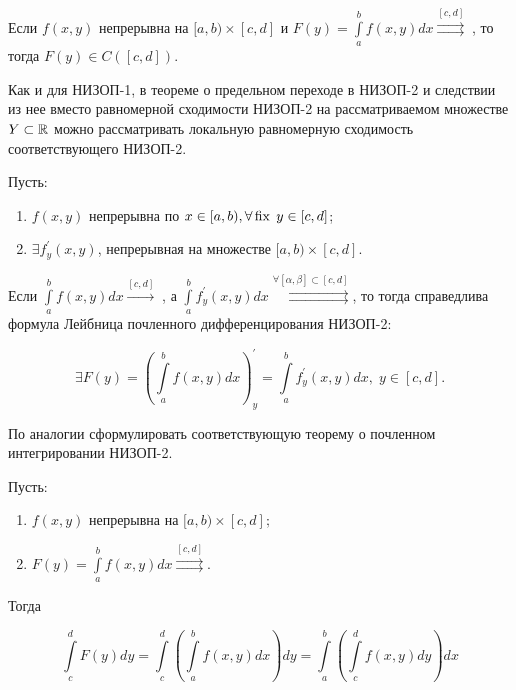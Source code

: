 \documentclass[../../main.tex]{subfiles}
\begin{document}
	\begin{crl*}
		Если $f(x, y)$ непрерывна на $[a, b) \times [c, d]$ и $F(y) = 
		\int\limits_a^b f(x, y) dx \overset{[c, d]}\rightrightarrows \;$, то тогда 
		$F(y) \in C([c, d])$.
	\end{crl*}

	\begin{rem}
		Как и для НИЗОП-1, в теореме о предельном переходе в НИЗОП-2 и следствии из 
		нее вместо равномерной сходимости НИЗОП-2 на рассматриваемом множестве $Y 
		\subset \mathbb{R}$ можно рассматривать локальную равномерную сходимость 
		соответствующего НИЗОП-2.
	\end{rem}

	\begin{thm}
		Пусть:

		\begin{enumerate}
			\item $f(x, y)$ непрерывна по $x \in [a, b), \forall \operatorname{fix} \; y \in [c, d]$;
			\item $\exists f^{'}_{y} (x, y)$, непрерывная на множестве $[a, b) \times 
			[c, d]$.
		\end{enumerate}

		Если $\int\limits_a^b f(x, y) dx \overset{[c, d]}\rightarrow\;$, а 
		$\int\limits_a^b f^{'}_y (x, y) dx \overset{\forall [\alpha, \beta] \subset 
		[c, d]}{\rightrightarrows}$, то тогда справедлива формула Лейбница 
		почленного дифференцирования НИЗОП-2:
		
		\[
		\exists F(y) = \left( \int\limits_a^b f(x, y) dx \right)^{'}_y = 
		\int\limits_a^b f^{'}_y (x, y) dx, \; y \in [c, d].
		\]
	\end{thm}

	\begin{exc}
		По аналогии сформулировать соответствующую теорему о почленном 
		интегрировании НИЗОП-2.
	\end{exc}

	\begin{eans}
		Пусть:
		\begin{enumerate}
			\item $f(x, y)$ непрерывна на $[a, b) \times [c, d];$
			\item $F(y) = \int\limits_a^b f(x, y) dx \overset{[c, 
			d]}{\rightrightarrows}.$
		\end{enumerate}
	
		Тогда
		
		\[
			\int\limits_c^d F(y) dy = \int\limits_c^d \left( \int\limits_a^b f(x, y) dx 
			\right) dy = \int\limits_a^b \left( \int\limits_c^d f(x, y) dy \right) dx
		\]
	
	\end{eans}
\end{document}
